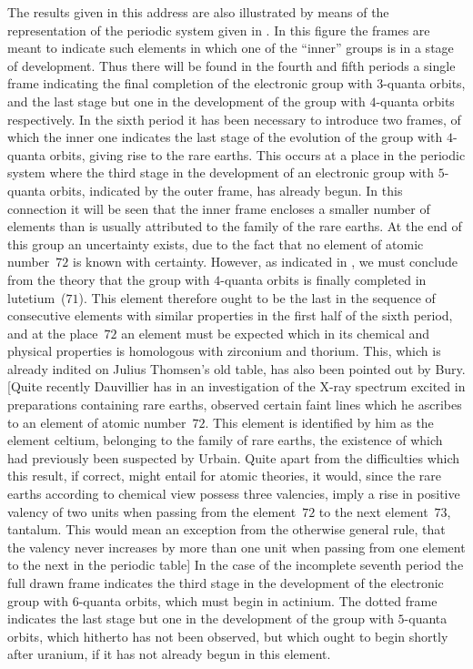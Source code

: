  The results given in this address
are also illustrated by means of the representation of the periodic
system given in . In this figure the frames are meant to
indicate such elements in which one of the ``inner'' groups is
in a stage of development. Thus there will be found in the
fourth and fifth periods a single frame indicating the final completion
of the electronic group with $3$-quanta orbits, and the
last stage but one in the development of the group with $4$-quanta
orbits respectively. In the sixth period it has been necessary to
introduce two frames, of which the inner one indicates the last
stage of the evolution of the group with $4$-quanta orbits, giving rise
to the rare earths. This occurs at a place in the periodic system
where the third stage in the development of an electronic group
with $5$-quanta orbits, indicated by the outer frame, has already
begun. In this connection it will be seen that the inner frame
encloses a smaller number of elements than is usually attributed
to the family of the rare earths. At the end of this group an
uncertainty exists, due to the fact that no element of atomic
number~$72$ is known with certainty. However, as indicated in
, we must conclude from the theory that the group with
$4$-quanta orbits is finally completed in lutetium~($71$). This element
therefore ought to be the last in the sequence of consecutive
elements with similar properties in the first half of the sixth period,
and at the place~$72$ an element must be expected which in its
chemical and physical properties is homologous with zirconium and
thorium. This, which is already indited on Julius Thomsen's old
table, has also been pointed out by Bury. [Quite recently Dauvillier
has in an investigation of the X-ray spectrum excited in preparations
containing rare earths, observed certain faint lines which he ascribes
to an element of atomic number~$72$. This element is identified by
him as the element celtium, belonging to the family of rare earths,
the existence of which had previously been suspected by Urbain.
Quite apart from the difficulties which this result, if correct, might
entail for atomic theories, it would, since the rare earths according
to chemical view possess three valencies, imply a rise in positive
valency of two units when passing from the element~$72$ to the
next element~$73$, tantalum. This would mean an exception from
the otherwise general rule, that the valency never increases by
more than one unit when passing from one element to the next in
the periodic table] In the case of the incomplete seventh period
the full drawn frame indicates the third stage in the development
of the electronic group with $6$-quanta orbits, which must begin in
actinium. The dotted frame indicates the last stage but one in
the development of the group with $5$-quanta orbits, which hitherto
has not been observed, but which ought to begin shortly after
uranium, if it has not already begun in this element.

